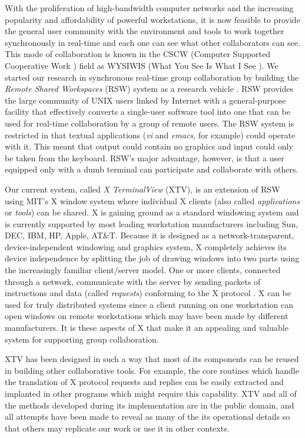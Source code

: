 With the proliferation of high-bandwidth computer networks and the
increasing popularity and affordability of powerful workstations, it is
now feasible to provide the general user community with the environment
and tools to work together synchronously in real-time and each one can
see what other collaborators can see. This mode of collaboration is
known in the CSCW (Computer Supported Cooperative Work \cite{Greif88})
field as WYSIWIS (What You See Is What I See \cite{Stefik86}).  We
started our research in synchronous real-time group collaboration by
building the {\it Remote Shared Workspaces} (RSW) system as a research
vehicle \cite{Abdel-Wahab88}.  RSW provides the large community of  UNIX
users linked by Internet \cite{Comer90} with a general-purpose facility
that effectively converts a single-user software tool into one that can
be used for real-time collaboration by a group of remote users.  The
RSW system is restricted in that textual applications ({\it vi}
and {\it emacs}, for example) could operate with it.  This meant that
output could contain no graphics and input could only be taken from the
keyboard.  RSW's major advantage, however, is that a user equipped only
with a dumb terminal can participate and collaborate with others.

Our current system, called {\it X TerminalView} (XTV), is an extension
of RSW using MIT's X window system \cite{Scheifler86} where individual
X clients (also called {\it applications} or {\it tools}) can be
shared.  X is gaining ground as a standard windowing system and is
currently supported by most leading workstation manufacturers including
Sun, DEC, IBM, HP, Apple, AT\&T.  Because it is designed as
a network-transparent, device-independent windowing and graphics
system, X completely achieves its device independence by splitting the
job of drawing windows into two parts using the increasingly familiar
client/server model.  One or more clients, connected through a network,
communicate with the server by sending packets of instructions and data
(called {\it requests}) conforming to the X protocol \cite{Nye890}.  X
can be used for truly distributed systems since a client running on one
workstation can open windows on remote workstations which may have been
made by different manufacturers.  It is these aspects of X that make it
an appealing and valuable system for supporting group collaboration. 

XTV has been designed in such a way that most of its components can be
reused in building other collaborative tools.  For example, the core
routines which handle the translation of X protocol requests and
replies can be easily extracted and implanted in other programs which
might require this capability.  XTV and all of the methods developed
during its implementation are in the public domain, and all attempts
have been made to reveal as many of the its operational details so that
others may replicate our work or use it in other contexts.

